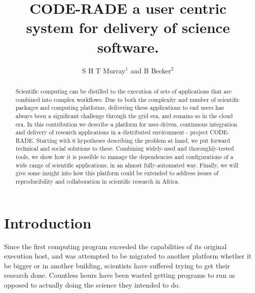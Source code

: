 \documentclass[a4paper]{jpconf}
\begin{document}
\title{CODE-RADE a user centric system for delivery of science software.}

\author{S H T Murray$^1$ and B Becker$^2$}

\address{$^1$ Center for High Performance Computing, CSIR, Rosebank, Cape Town, South Africa}
\address{$^2$ Meraka Cyberinfrastructure, CSIR, Lynwood, Pretoria, , South Africa}


\begin{abstract}
Scientific computing can be distilled to the execution of sets 
of applications that are combined into complex workflows. Due to both the complexity and number of 
scientific packages and computing platforms, delivering these applications to end users has always 
been a significant challenge through the grid era, and remains so in the cloud era. In this contribution 
we describe a platform for user-driven, continuous integration and delivery of research applications 
in a distributed environment - project CODE-RADE. Starting with 6 hypotheses describing the problem at 
hand, we put forward technical and social solutions to these. Combining widely-used and thoroughly-tested 
tools, we show how it is possible to manage the dependencies and configurations of a wide range of 
scientific applications, in an almost fully-automated way. 
Finally, we will give some insight into how this platform could be extended to address 
issues of reproducibility and collaboration in scientific research in Africa.
\end{abstract}

\section{Introduction}
Since the first computing program exceeded the capabilities of its original execution host, and was 
attempted to be migrated to another platform whether it be bigger or in another building, 
scientists have suffered trying to get their research done. Countless hours have been wasted 
getting programs to run as opposed to actually doing the science they intended to do.
\end{document}
